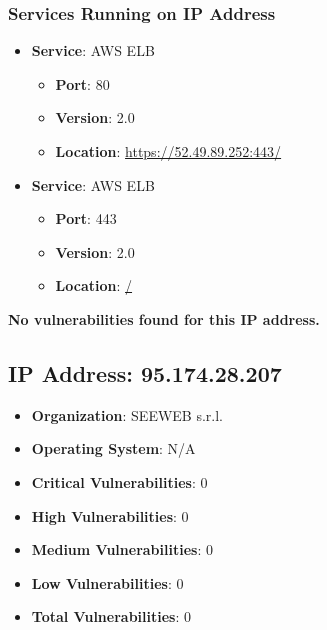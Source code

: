 \documentclass{article}
\begin{document}
\subsubsection*{Services Running on IP Address}

\begin{itemize}
    
        \item \textbf{Service}: AWS ELB
        \begin{itemize}
            \item \textbf{Port}: 80
            \item \textbf{Version}:  2.0 
            \item \textbf{Location}: \href{ https://52.49.89.252:443/ }{ https://52.49.89.252:443/ }
        \end{itemize}
    
        \item \textbf{Service}: AWS ELB
        \begin{itemize}
            \item \textbf{Port}: 443
            \item \textbf{Version}:  2.0 
            \item \textbf{Location}: \href{ / }{ / }
        \end{itemize}
    
\end{itemize}


\textbf{No vulnerabilities found for this IP address.}




\clearpage



\subsection*{IP Address: 95.174.28.207}

\begin{itemize}
    \item \textbf{Organization}: SEEWEB s.r.l.
    \item \textbf{Operating System}:  N/A 
    \item \textbf{Critical Vulnerabilities}: 0
    \item \textbf{High Vulnerabilities}: 0
    \item \textbf{Medium Vulnerabilities}: 0
    \item \textbf{Low Vulnerabilities}: 0
    \item \textbf{Total Vulnerabilities}: 0
\end{itemize}
\end{document}

